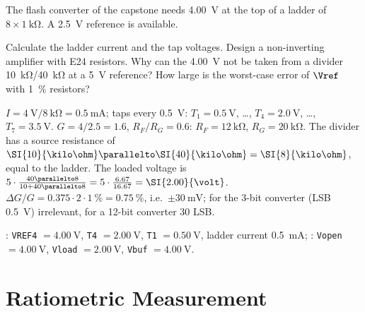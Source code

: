 The flash converter of the capstone needs \SI{4.00}{\volt} at the top of a
ladder of $8\times\SI{1}{\kilo\ohm}$. A \SI{2.5}{\volt} reference is available.
\begin{talist}
\ta Calculate the ladder current and the tap voltages.
\ta Design a non-inverting amplifier with E24 resistors.
\ta Why can the \SI{4.00}{\volt} not be taken from a divider \SI{10}{\kilo\ohm}/\SI{40}{\kilo\ohm} at a \SI{5}{\volt} reference?
\ta How large is the worst-case error of $\Vref$ with \SI{1}{\percent} resistors?
\end{talist}

\begin{solution}
\begin{talist}
\ta $I = \SI{4}{\volt}/\SI{8}{\kilo\ohm} = \SI{0.5}{\milli\ampere}$; taps every \SI{0.5}{\volt}: $T_1 = \SI{0.5}{\volt}$, \ldots, $T_4 = \SI{2.0}{\volt}$, \ldots, $T_7 = \SI{3.5}{\volt}$.
\ta $G = 4/2.5 = 1.6$, $R_F/R_G = 0.6$: $R_F = \SI{12}{\kilo\ohm}$, $R_G = \SI{20}{\kilo\ohm}$.
\ta The divider has a source resistance of $\SI{10}{\kilo\ohm}\parallelto\SI{40}{\kilo\ohm} = \SI{8}{\kilo\ohm}$, equal to the
	ladder. The loaded voltage is $5\cdot\frac{40\parallelto 8}{10 + 40\parallelto 8} = 5\cdot\frac{6.67}{16.67} = \SI{2.00}{\volt}$.
\ta $\Delta G/G = 0.375\cdot 2\cdot\SI{1}{\percent} = \SI{0.75}{\percent}$, i.e.\ $\pm\SI{30}{\milli\volt}$;
	for the 3-bit converter (LSB \SI{0.5}{\volt}) irrelevant, for a 12-bit converter 30 LSB.
\item[] : \texttt{VREF4} $=\SI{4.00}{\volt}$, \texttt{T4} $=\SI{2.00}{\volt}$,
	\texttt{T1} $=\SI{0.50}{\volt}$, ladder current \SI{0.5}{\milli\ampere};
	: \texttt{Vopen} $=\SI{4.00}{\volt}$, \texttt{Vload} $=\SI{2.00}{\volt}$,
	\texttt{Vbuf} $=\SI{4.00}{\volt}$.
\end{talist}
\end{solution}

\section{Ratiometric Measurement}

